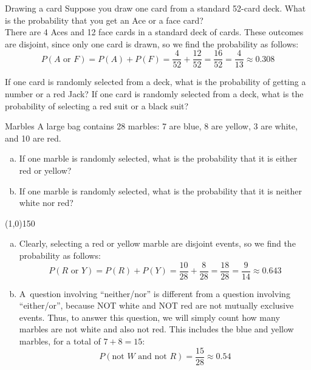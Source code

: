 \begin{example}[https://www.youtube.com/watch?v=uD6AB7t_Das]{Drawing a card}
Suppose you draw one card from a standard 52-card deck. What is the probability that you get an Ace or a face card? \\

 There are 4 Aces and 12 face cards in a standard deck of cards. These outcomes are disjoint, since only one card is drawn, so we find the probability as follows:
\[ P( A \mbox{ or } F ) = P(A) + P(F) = \frac{4}{52} + \frac{12}{52} = \frac{16}{52} = \frac{4}{13} \approx 0.308\]
\end{example}

\begin{try}
If one card is randomly selected from a deck, what is the probability of getting a number or a red Jack? If one card is randomly selected from a deck, what is the probability of selecting a red suit or a black suit?
\end{try}
\vfill
\pagebreak

\begin{example}[https://www.youtube.com/watch?v=eS3h94W2Lnk]{Marbles}
A large bag contains 28 marbles: 7 are blue, 8 are yellow, 3 are white, and 10 are  red. 
\begin{enumerate}[(a)]
\item If one marble is randomly selected, what is the probability that it is either red or yellow?
\item If one marble is randomly selected, what is the probability that it is neither white nor red?
\end{enumerate}

\begin{center}
\line(1,0){150}
\end{center}

\begin{enumerate}[(a)]
\item Clearly, selecting a red or yellow marble are disjoint events, so we find the probability as follows:
\[ P( R \mbox{ or } Y ) = P(R) + P(Y) = \frac{10}{28} + \frac{8}{28} = \frac{18}{28} = \frac{9}{14} \approx 0.643\]
\item A\sol\ question involving ``neither/nor'' is different from a question involving ``either/or'', because NOT white and NOT red are not mutually exclusive events.  Thus, to answer this question, we will simply count how many marbles are not white and also not red.  This includes the blue and yellow marbles, for a total of $7 + 8 = 15$:
\[P(\textrm{not } W \textrm{ and not } R) = \dfrac{15}{28} \approx 0.54\]
\end{enumerate}
\end{example}

